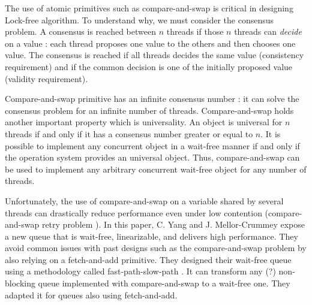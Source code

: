 The use of atomic primitives such as compare-and-swap is critical in designing
Lock-free algorithm. To understand why, we must consider the consensus problem.
A consensus is reached between $n$ threads if those $n$ threads can
\textit{decide} on a value : each thread proposes one value to the others and
then chooses one value. The consensus is reached if all threads decides the same
value (consistency requirement) and if the common decision is one of the
initially proposed value (validity requirement).

Compare-and-swap primitive has an infinite consensus number
\cite{Herlihy:1991:WS:114005.102808} : it can solve the consensus problem for an
infinite number of threads. Compare-and-swap holds another important property
which is universality. An object is universal for $n$ threads if and only if it
has a consensus number greater or equal to $n$. It is possible to implement any
concurrent object in a wait-free manner if and only if the operation system
provides an universal object. Thus, compare-and-swap can be used to implement
any arbitrary concurrent wait-free object for any number of threads.

Unfortunately, the use of compare-and-swap on a variable shared by several
threads can drastically reduce performance even under low contention
(compare-and-swap retry problem \cite{Morrison:2013:FCQ:2517327.2442527}). In
this paper, C. Yang and J. Mellor-Crummey expose a new queue that is wait-free,
linearizable, and delivers high performance. They avoid common issues with past
designs such as the compare-and-swap problem by also relying on a fetch-and-add
primitive. They designed their wait-free queue using a methodology called
fast-path-slow-path \cite{Kogan:2012:MCF:2370036.2145835}. It can transform any
(?) non-blocking queue implemented with compare-and-swap to a wait-free one.
They adapted it for queues also using fetch-and-add.

